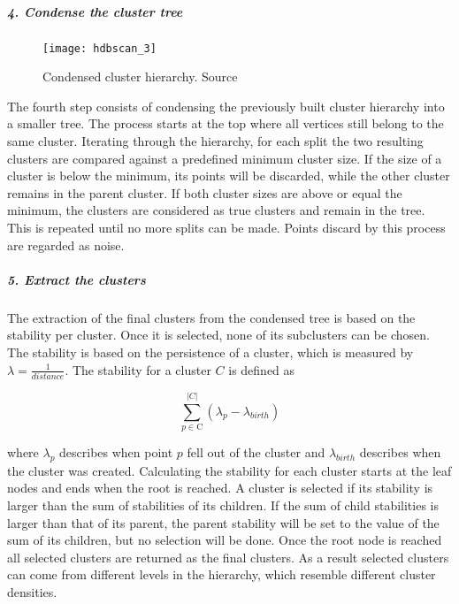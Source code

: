 \subparagraph{4. Condense the cluster tree}
\begin{figure}[h]
    \centering
    \texttt{[image: hdbscan\_3]}
    \caption{
        Condensed cluster hierarchy.
        Source\cite{how_hdbscan_works}
    }
    \label{fig:hdbscan_3}
\end{figure}

The fourth step consists of condensing the previously built cluster hierarchy into a smaller tree.
The process starts at the top where all vertices still belong to the same cluster.
Iterating through the hierarchy,
for each split the two resulting clusters are compared against a predefined minimum cluster size.
If the size of a cluster is below the minimum,
its points will be discarded, while the other cluster remains in the parent cluster.
If both cluster sizes are above or equal the minimum, the clusters are considered as true clusters and remain in the tree.
This is repeated until no more splits can be made. 
Points discard by this process are regarded as noise. 

\subparagraph{5. Extract the clusters}
The extraction of the final clusters from the condensed tree is based on the stability per cluster.
Once it is selected, none of its subclusters can be chosen.
The stability is based on the persistence of a cluster, which is measured by $\lambda = \frac{1}{distance}$.
The stability for a cluster $C$ is defined as

\begin{equation}
\sum_{p \in \text{C}}^{|C|} ({\lambda}_{p} - {\lambda}_{birth})
\end{equation}

where ${\lambda}_{p}$ describes when point $p$ fell out of the cluster and $ {\lambda}_{birth}$
describes when the cluster was created.
Calculating the stability for each cluster starts at the leaf nodes and ends when the root is reached.
A cluster is selected if its stability is larger than the sum of stabilities of its children.
If the sum of child stabilities is larger than that of its parent,
the parent stability will be set to the value of the sum of its children,
but no selection will be done.
Once the root node is reached all selected clusters are returned as the final clusters.
As a result selected clusters can come from different levels in the hierarchy, 
which resemble different cluster densities.